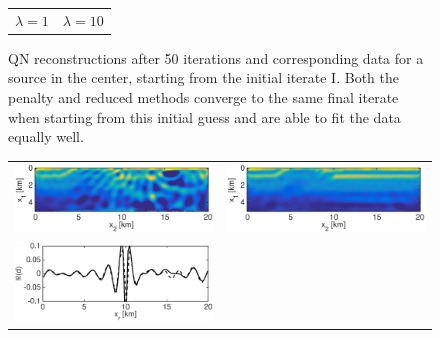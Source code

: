 \documentclass{iopart}
\begin{document}
\begin{figure}
\begin{tabular}{cc}
{\small $\lambda=1$}&
{\small $\lambda=10$}\\
\end{tabular}
\caption{QN reconstructions after 50 iterations and corresponding data for a source in the center, starting from the initial iterate I. Both the penalty and reduced methods converge to the same final iterate when starting from this initial guess and are able to fit the data equally well.}
\label{fig:2D_overthrust1}
\end{figure}

\begin{figure}
\centering
\begin{tabular}{cc}
\includegraphics[scale=.3]{./figs/2D_overthrust2_g}&
\includegraphics[scale=.3]{./figs/2D_overthrust2_h}\\
\includegraphics[scale=.3]{./figs/2D_overthrust2_l}&

\end{tabular}
\end{figure}
\end{document}
